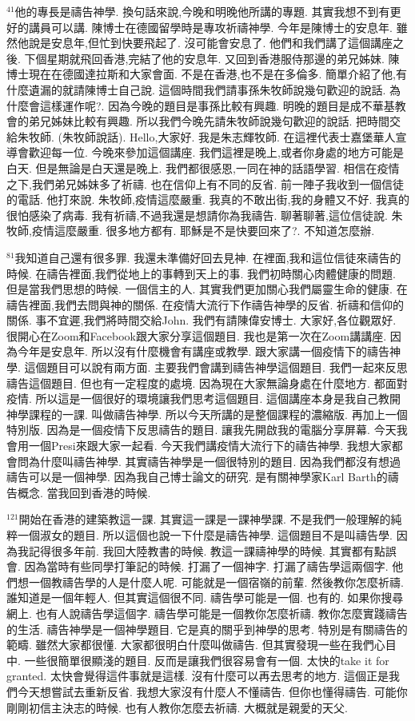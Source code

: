 \documentclass{book}
\begin{document}
$^{41}$他的專長是禱告神學.
換句話來說,今晚和明晚他所講的專題.
其實我想不到有更好的講員可以講.
陳博士在德國留學時是專攻祈禱神學.
今年是陳博士的安息年.
雖然他說是安息年,但忙到快要飛起了.
沒可能會安息了.
他們和我們講了這個講座之後.
下個星期就飛回香港,完結了他的安息年.
又回到香港服侍那邊的弟兄姊妹.
陳博士現在在德國達拉斯和大家會面.
不是在香港,也不是在多倫多.
簡單介紹了他,有什麼遺漏的就請陳博士自己說.
這個時間我們請事孫朱牧師說幾句歡迎的說話.
為什麼會這樣運作呢?.
因為今晚的題目是事孫比較有興趣.
明晚的題目是成不華基教會的弟兄姊妹比較有興趣.
所以我們今晚先請朱牧師說幾句歡迎的說話.
把時間交給朱牧師.
(朱牧師說話).
Hello,大家好.
我是朱志輝牧師.
在這裡代表士嘉堡華人宣導會歡迎每一位.
今晚來參加這個講座.
我們這裡是晚上,或者你身處的地方可能是白天.
但是無論是白天還是晚上.
我們都很感恩,一同在神的話語學習.
相信在疫情之下,我們弟兄姊妹多了祈禱.
也在信仰上有不同的反省.
前一陣子我收到一個信徒的電話.
他打來說.
朱牧師,疫情這麼嚴重.
我真的不敢出街,我的身體又不好.
我真的很怕感染了病毒.
我有祈禱,不過我還是想請你為我禱告.
聊著聊著,這位信徒說.
朱牧師,疫情這麼嚴重.
很多地方都有.
耶穌是不是快要回來了?.
不知道怎麼辦.

$^{81}$我知道自己還有很多罪.
我還未準備好回去見神.
在裡面,我和這位信徒來禱告的時候.
在禱告裡面,我們從地上的事轉到天上的事.
我們初時關心肉體健康的問題.
但是當我們思想的時候.
一個信主的人.
其實我們更加關心我們屬靈生命的健康.
在禱告裡面,我們去問與神的關係.
在疫情大流行下作禱告神學的反省.
祈禱和信仰的關係.
事不宜遲,我們將時間交給John.
我們有請陳偉安博士.
大家好,各位觀眾好.
很開心在Zoom和Facebook跟大家分享這個題目.
我也是第一次在Zoom講講座.
因為今年是安息年.
所以沒有什麼機會有講座或教學.
跟大家講一個疫情下的禱告神學.
這個題目可以說有兩方面.
主要我們會講到禱告神學這個題目.
我們一起來反思禱告這個題目.
但也有一定程度的處境.
因為現在大家無論身處在什麼地方.
都面對疫情.
所以這是一個很好的環境讓我們思考這個題目.
這個講座本身是我自己教開神學課程的一課.
叫做禱告神學.
所以今天所講的是整個課程的濃縮版.
再加上一個特別版.
因為是一個疫情下反思禱告的題目.
讓我先開啟我的電腦分享屏幕.
今天我會用一個Presi來跟大家一起看.
今天我們講疫情大流行下的禱告神學.
我想大家都會問為什麼叫禱告神學.
其實禱告神學是一個很特別的題目.
因為我們都沒有想過禱告可以是一個神學.
因為我自己博士論文的研究.
是有關神學家Karl Barth的禱告概念.
當我回到香港的時候.

$^{121}$開始在香港的建築教這一課.
其實這一課是一課神學課.
不是我們一般理解的純粹一個淑女的題目.
所以這個也說一下什麼是禱告神學.
這個題目不是叫禱告學.
因為我記得很多年前.
我回大陸教書的時候.
教這一課禱神學的時候.
其實都有點誤會.
因為當時有些同學打筆記的時候.
打漏了一個神字.
打漏了禱告學這兩個字.
他們想一個教禱告學的人是什麼人呢.
可能就是一個宿嶺的前輩.
然後教你怎麼祈禱.
誰知道是一個年輕人.
但其實這個很不同.
禱告學可能是一個.
也有的.
如果你搜尋網上.
也有人說禱告學這個字.
禱告學可能是一個教你怎麼祈禱.
教你怎麼實踐禱告的生活.
禱告神學是一個神學題目.
它是真的關乎到神學的思考.
特別是有關禱告的範疇.
雖然大家都很懂.
大家都很明白什麼叫做禱告.
但其實發現一些在我們心目中.
一些很簡單很顯淺的題目.
反而是讓我們很容易會有一個.
太快的take it for granted.
太快會覺得這件事就是這樣.
沒有什麼可以再去思考的地方.
這個正是我們今天想嘗試去重新反省.
我想大家沒有什麼人不懂禱告.
但你也懂得禱告.
可能你剛剛初信主決志的時候.
也有人教你怎麼去祈禱.
大概就是親愛的天父.
\end{document}
